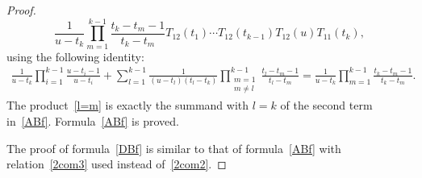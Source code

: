\documentclass[pdftex]{sigma}
\numberwithin{equation}{section}
\begin{document}
\begin{proof}
\begin{equation}\label{l=m}
\frac{1}{u-t_k}\prod_{m=1}^{k-1} \frac{t_k-t_m-1}{t_k-t_m} T_{12} (t_1)\cdots T_{12} (t_{k-1}) T_{12} (u)T_{11} (t_k),
\end{equation}
using the following identity:
\begin{gather*}
\frac{1}{u-t_k} \prod_{i=1}^{k-1}\frac{u-t_i-1}{u-t_i} + \sum_{l=1}^{k-1} \frac{1}{(u-t_l)(t_l-t_k)}\prod_{\substack{m=1\\m\neq l}}^{k-1} \frac{t_l-t_m-1}{t_l-t_m}= \frac{1}{u-t_k}\prod_{m=1}^{k-1} \frac{t_k-t_m-1}{t_k-t_m}.
\end{gather*}
The product~\eqref{l=m} is exactly the summand with $l=k$ of the second term in~\eqref{ABf}. Formula~\eqref{ABf} is proved.

The proof of formula~\eqref{DBf} is similar to that of formula~\eqref{ABf} with relation~\eqref{2com3} used instead of~\eqref{2com2}.
\end{proof}
\end{document}
